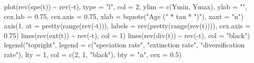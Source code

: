 \documentclass[
]{article}
\newenvironment{Shaded}{\begin{snugshade}}{\end{snugshade}}
\newcommand{\AttributeTok}[1]{\textcolor[rgb]{0.77,0.63,0.00}{#1}}
\newcommand{\DecValTok}[1]{\textcolor[rgb]{0.00,0.00,0.81}{#1}}
\newcommand{\FloatTok}[1]{\textcolor[rgb]{0.00,0.00,0.81}{#1}}
\newcommand{\FunctionTok}[1]{\textcolor[rgb]{0.00,0.00,0.00}{#1}}
\newcommand{\NormalTok}[1]{#1}
\newcommand{\SpecialCharTok}[1]{\textcolor[rgb]{0.00,0.00,0.00}{#1}}
\newcommand{\StringTok}[1]{\textcolor[rgb]{0.31,0.60,0.02}{#1}}
\begin{document}
\begin{Shaded}
\begin{Highlighting}[]
    \FunctionTok{plot}\NormalTok{(}\FunctionTok{rev}\NormalTok{(}\FunctionTok{spe}\NormalTok{(t)) }\SpecialCharTok{\textasciitilde{}} \FunctionTok{rev}\NormalTok{(}\SpecialCharTok{{-}}\NormalTok{t), }\AttributeTok{type =} \StringTok{"l"}\NormalTok{, }\AttributeTok{col =} \DecValTok{2}\NormalTok{, }\AttributeTok{ylim =} \FunctionTok{c}\NormalTok{(Ymin,}
\NormalTok{        Ymax), }\AttributeTok{ylab =} \StringTok{""}\NormalTok{, }\AttributeTok{cex.lab =} \FloatTok{0.75}\NormalTok{, }\AttributeTok{cex.axis =} \FloatTok{0.75}\NormalTok{, }\AttributeTok{xlab =} \FunctionTok{bquote}\NormalTok{(}\StringTok{"Age ("} \SpecialCharTok{*}
\NormalTok{        tau }\SpecialCharTok{*} \StringTok{")"}\NormalTok{), }\AttributeTok{xaxt =} \StringTok{"n"}\NormalTok{)}
    \FunctionTok{axis}\NormalTok{(}\DecValTok{1}\NormalTok{, }\AttributeTok{at =} \FunctionTok{pretty}\NormalTok{(}\FunctionTok{range}\NormalTok{(}\FunctionTok{rev}\NormalTok{(}\SpecialCharTok{{-}}\NormalTok{t))), }\AttributeTok{labels =} \FunctionTok{rev}\NormalTok{(}\FunctionTok{pretty}\NormalTok{(}\FunctionTok{range}\NormalTok{(}\FunctionTok{rev}\NormalTok{(t)))),}
        \AttributeTok{cex.axis =} \FloatTok{0.75}\NormalTok{)}
    \FunctionTok{lines}\NormalTok{(}\FunctionTok{rev}\NormalTok{(}\FunctionTok{ext}\NormalTok{(t)) }\SpecialCharTok{\textasciitilde{}} \FunctionTok{rev}\NormalTok{(}\SpecialCharTok{{-}}\NormalTok{t), }\AttributeTok{col =} \DecValTok{1}\NormalTok{)}
    \FunctionTok{lines}\NormalTok{(}\FunctionTok{rev}\NormalTok{(}\FunctionTok{div}\NormalTok{(t)) }\SpecialCharTok{\textasciitilde{}} \FunctionTok{rev}\NormalTok{(}\SpecialCharTok{{-}}\NormalTok{t), }\AttributeTok{col =} \StringTok{"black"}\NormalTok{)}
    \FunctionTok{legend}\NormalTok{(}\StringTok{"topright"}\NormalTok{, }\AttributeTok{legend =} \FunctionTok{c}\NormalTok{(}\StringTok{"speciation rate"}\NormalTok{, }\StringTok{"extinction rate"}\NormalTok{,}
        \StringTok{"diversification rate"}\NormalTok{), }\AttributeTok{lty =} \DecValTok{1}\NormalTok{, }\AttributeTok{col =} \FunctionTok{c}\NormalTok{(}\DecValTok{2}\NormalTok{, }\DecValTok{1}\NormalTok{, }\StringTok{"black"}\NormalTok{),}
        \AttributeTok{bty =} \StringTok{"n"}\NormalTok{, }\AttributeTok{cex =} \FloatTok{0.5}\NormalTok{)}


\end{Highlighting}
\end{Shaded}
\end{document}
